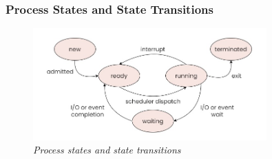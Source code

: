 \documentclass[12pt]{article}
\begin{document}
    \subsubsection{Process States and State Transitions}
\begin{figure}[h]
    \centering
    \includegraphics[width=0.8\textwidth]{asset/process-state.jpg}
    \caption{\textit{Process states and state transitions}}
    \label{fig:process_state}
\end{figure}
\end{document}
